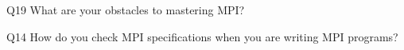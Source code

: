 \begin{description}%
\item{Q19} What are your obstacles to mastering MPI?%
\item{Q14} How do you check MPI specifications when you are writing MPI programs?%
\end{description}%
